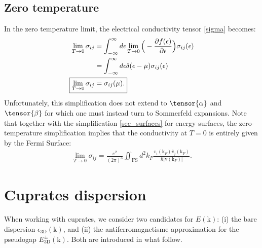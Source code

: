\documentclass[notitlepage,11pt,nofootinbib]{revtex4-1}
\renewcommand{\vec}[1]{\bm{\mathrm{#1}}}
\begin{document}
\subsection{Zero temperature}
In the zero temperature limit, the electrical conductivity tensor \eqref{sigma} becomes: 
\begin{align}
\lim_{T\rightarrow 0}\sigma_{ij}
&=
\int_{-\infty}^{\infty} d\epsilon
\lim_{T\rightarrow 0}\Big(-\frac{\partial f(\epsilon)}{\partial\epsilon}\Big) \sigma_{ij}(\epsilon)
\\
&=
\int_{-\infty}^{\infty} d\epsilon
\delta(\epsilon-\mu) \sigma_{ij}(\epsilon)
\\
\Aboxed{
\lim_{T\rightarrow 0}\sigma_{ij}&=\sigma_{ij}(\mu).
}
\end{align}
Unfortunately, this simplification does not extend to $\tensor{\alpha}$ and $\tensor{\beta}$ for which one must instead turn to Sommerfeld expansions.
Note that together with the simplification \ref{sec_surfaces} for energy surfaces, the zero-temperature simplification implies that the conductivity at $T=0$ is entirely given by the Fermi Surface:
\begin{align}
\lim_{T\rightarrow0}\sigma_{ij} 
=\frac{e^2}{(2\pi)^3}\iint_{\text{FS}}d^2k_F
\frac{v_{i}(\vec k_F)\bar{v}_{j}(\vec k_F)}{\hbar|\vec v(\vec k_F)|}.
\label{zeroTemperature}
\end{align}


\section{Cuprates dispersion}\label{section_disp}
\noindent
When working with cuprates, we consider two candidates for $E(\vec k)$: (i) the bare dispersion $\epsilon_{\text{3D}}(\vec k)$, and (ii) the antiferromagnetisme approximation for the pseudogap $E^{\pm}_{\text{3D}}(\vec k)$. Both are introduced in what follow.
\end{document}
